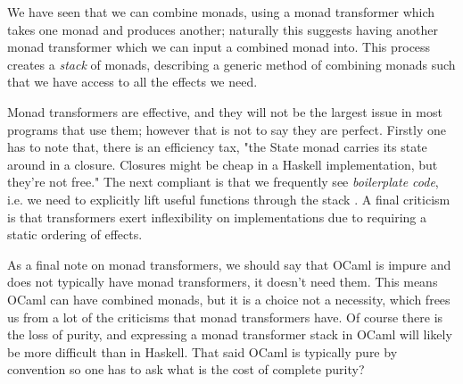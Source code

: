 We have seen that we can combine monads,
using a monad transformer which takes one monad
and produces another;
naturally this suggests
having another monad transformer which we can input
a combined monad into.
This process creates a \textit{stack} of monads,
describing a generic method of combining monads
such that we have access to all the effects we need.

Monad transformers are effective,
and they will not be the largest issue in most programs
that use them;
however that is not to say they are perfect.
Firstly one has to note that, there is an efficiency tax,
"the State monad carries its state around in a closure.
Closures might be cheap in a Haskell implementation, but they're not free."
\cite{o2008real}
The next compliant is that we frequently see \textit{boilerplate code},
i.e. we need to explicitly lift useful functions through the stack
\cite{kammar2013handlers}.
A final criticism is that transformers exert inflexibility on implementations
due to requiring a static ordering of effects.

As a final note on monad transformers,
we should say that OCaml is impure and does not typically have monad transformers,
it doesn't need them.
This means OCaml can have combined monads,
but it is a choice not a necessity,
which frees us from a lot of the criticisms that monad transformers have.
Of course there is the loss of purity, and expressing a monad
transformer stack in OCaml will likely be more difficult than in Haskell.
That said OCaml is typically pure by convention so one has to ask
what is the cost of complete purity?

